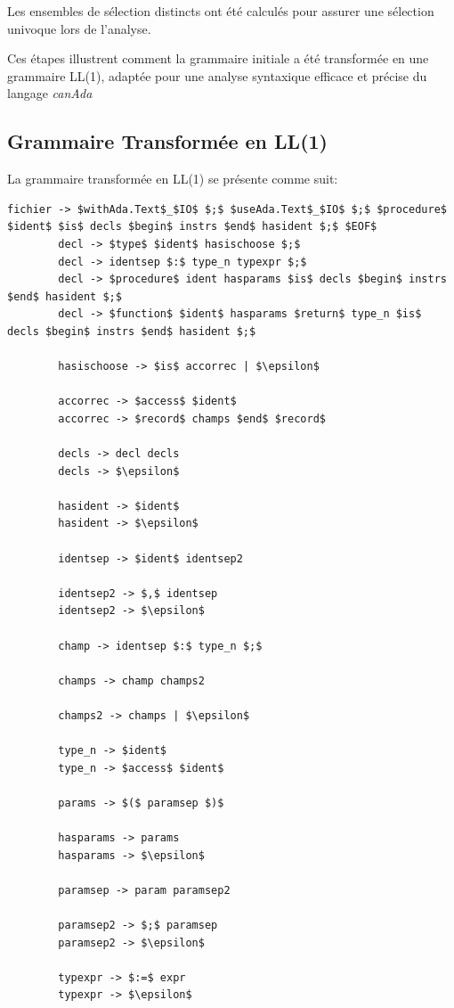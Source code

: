 \documentclass[french,a4paper]{article}
\begin{document}
    Les ensembles de sélection distincts ont été calculés pour assurer une sélection univoque lors de l'analyse.

    Ces étapes illustrent comment la grammaire initiale a été transformée en une grammaire LL(1), adaptée pour une analyse syntaxique efficace et précise du langage \textit{canAda}

    \subsection{Grammaire Transformée en LL(1)}\label{subsec:grammaire-transformee-en-ll(1)}
    La grammaire transformée en LL(1) se présente comme suit:
    \begin{lstlisting}[label={lst:lstlisting9}]
        fichier -> $withAda.Text$_$IO$ $;$ $useAda.Text$_$IO$ $;$ $procedure$ $ident$ $is$ decls $begin$ instrs $end$ hasident $;$ $EOF$
        decl -> $type$ $ident$ hasischoose $;$
        decl -> identsep $:$ type_n typexpr $;$
        decl -> $procedure$ ident hasparams $is$ decls $begin$ instrs $end$ hasident $;$
        decl -> $function$ $ident$ hasparams $return$ type_n $is$ decls $begin$ instrs $end$ hasident $;$

        hasischoose -> $is$ accorrec | $\epsilon$

        accorrec -> $access$ $ident$
        accorrec -> $record$ champs $end$ $record$

        decls -> decl decls
        decls -> $\epsilon$

        hasident -> $ident$
        hasident -> $\epsilon$

        identsep -> $ident$ identsep2

        identsep2 -> $,$ identsep
        identsep2 -> $\epsilon$

        champ -> identsep $:$ type_n $;$

        champs -> champ champs2

        champs2 -> champs | $\epsilon$

        type_n -> $ident$
        type_n -> $access$ $ident$

        params -> $($ paramsep $)$

        hasparams -> params
        hasparams -> $\epsilon$

        paramsep -> param paramsep2

        paramsep2 -> $;$ paramsep
        paramsep2 -> $\epsilon$

        typexpr -> $:=$ expr
        typexpr -> $\epsilon$


\end{lstlisting}
\end{document}
